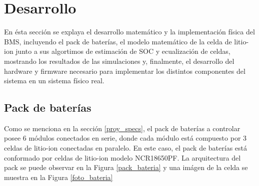 \documentclass[10pt,a4paper]{article}
\begin{document}
\newpage

\section{Desarrollo}\label{desarrollo}

En \'esta secci\'on se explaya el desarrollo matem\'atico y la implementaci\'on 
f\'isica del \acrshort{BMS}, incluyendo el pack de bater\'ias, el modelo 
matem\'atico de la celda de litio-ion junto a sus algortimos de estimaci\'on de 
\acrshort{SOC} y ecualizaci\'on de celdas, mostrando los resultados de las
simulaciones y, finalmente, el desarrollo del hardware y firmware necesario para
implementar los distintos componentes del sistema en un sistema f\'isico real.

\subsection{Pack de bater\'ias}

Como se menciona en la secci\'on \ref{proy_specs}, el pack de bater\'ias a
controlar posee 6 m\'odulos conectados en serie, donde cada m\'odulo est\'a
compuesto por 3 celdas de litio-ion conectadas en paralelo. En este caso, el pack
de bater\'ias est\'a conformado por celdas de litio-ion modelo NCR18650PF. La
arquitectura del pack se puede observar en la Figura \ref{pack_bateria} y una
im\'agen de la celda se muestra en la Figura \ref{foto_bateria}
\end{document}
